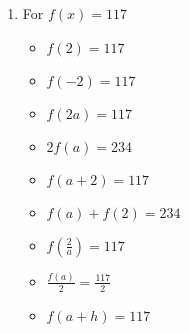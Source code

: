 \documentclass{ximera}
\begin{document}
\begin{enumerate}
\begin{multicols}{3}
\begin{itemize}
\vfill

\columnbreak

\item $\frac{f(a)}{2} =  \frac{3a^2+3a-2}{2}$

\vfill

\columnbreak


\item  $f(a + h) = 3a^2 + 6ah + 3h^2+3a+3h-2$

\end{itemize}
\end{multicols}



\item For $f(x) = 117$

\begin{multicols}{3}
\begin{itemize}

\item  $f(2) = 117$
\item  $f(-2) = 117$
\item  $f(2a) = 117$

\end{itemize}
\end{multicols}

\begin{multicols}{3}
\begin{itemize}

\item  $2 f(a) = 234$
\item $f(a+2) = 117$
\item $f(a) + f(2) = 234$

\end{itemize}
\end{multicols}

\begin{multicols}{3}
\begin{itemize}

\item  $f \left( \frac{2}{a} \right) = 117$ 

\vfill

\columnbreak

\item $\frac{f(a)}{2} = \frac{117}{2}$

\vfill

\columnbreak


\item  $f(a + h) = 117$

\end{itemize}
\end{multicols}




\end{enumerate}
\end{document}

